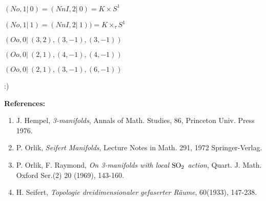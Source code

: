 \documentclass[12pt]{article}
\begin{document}
$(No,1|\ 0)=(NnI,2|\ 0)=K\times S^1$

$(No,1|\ 1)=(NnI,2|\ 1))=K\times_{\tau} S^1$

$(Oo,0|\ (3,2),(3,-1),(3,-1))$

$(Oo,0|\ (2,1),(4,-1),(4,-1))$

$(Oo,0|\ (2,1),(3,-1),(6,-1))$

:)

{\bf References:}

\begin{enumerate}
\item J. Hempel, {\it 3-manifolds}, Annals of Math. Studies, 86, Princeton Univ. Press 1976.
\item P. Orlik, {\it Seifert Manifolds}, Lecture Notes in Math. 291, 1972 Springer-Verlag.
\item P. Orlik, F. Raymond, {\it On 3-manifolds with local ${\rm SO}_2$ action}, Quart. J. Math. Oxford Ser.(2) 20 (1969), 143-160.
\item H. Seifert, {\it Topologie dreidimensionaler gefaserter R\"aume}, 60(1933), 147-238.
\end{enumerate}
\end{document}

